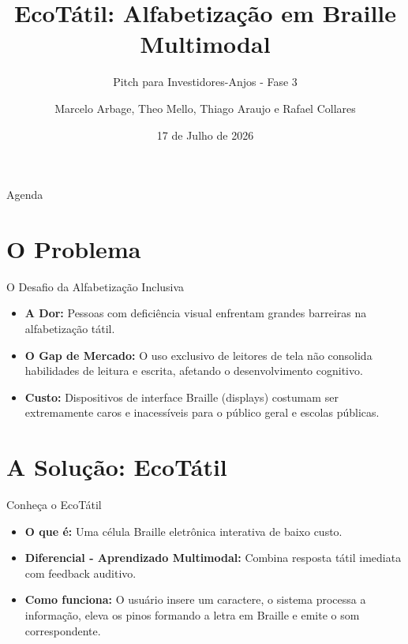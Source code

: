 \documentclass[aspectratio=169]{beamer} %
\title[Projeto EcoTátil]{EcoTátil: Alfabetização em Braille Multimodal}
\subtitle{Pitch para Investidores-Anjos - Fase 3}
\author[Jumpers]{Marcelo Arbage, Theo Mello, Thiago Araujo e Rafael Collares}
\institute[UFPA]{
  Empresa Jumpers - Tecnologia Assistiva\\
  Universidade Federal do Pará (UFPA)
}
\date{17 de Julho de 2026}
\begin{document}
\begin{frame}
  \titlepage
\end{frame}

\begin{frame}{Agenda}
  \tableofcontents
\end{frame}

\section{O Problema}
\begin{frame}{O Desafio da Alfabetização Inclusiva}
  \begin{itemize}
    \item \textbf{A Dor:} Pessoas com deficiência visual enfrentam grandes barreiras na alfabetização tátil.
    \item \textbf{O Gap de Mercado:} O uso exclusivo de leitores de tela não consolida habilidades de leitura e escrita, afetando o desenvolvimento cognitivo.
    \item \textbf{Custo:} Dispositivos de interface Braille (displays) costumam ser extremamente caros e inacessíveis para o público geral e escolas públicas.
  \end{itemize}
\end{frame}

\section{A Solução: EcoTátil}
\begin{frame}{Conheça o EcoTátil}
  \begin{itemize}
    \item \textbf{O que é:} Uma célula Braille eletrônica interativa de baixo custo.
    \item \textbf{Diferencial - Aprendizado Multimodal:} Combina resposta tátil imediata com feedback auditivo.
    \item \textbf{Como funciona:} O usuário insere um caractere, o sistema processa a informação, eleva os pinos formando a letra em Braille e emite o som correspondente.
  \end{itemize}
\end{frame}
\end{document}
